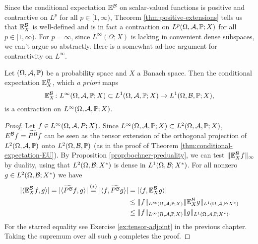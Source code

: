 Since the conditional expectation $\mathbb{E}^{\mathcal{B}}$ on scalar-valued functions is positive and contractive on $L^p$ for all $p \in [1,\infty)$, Theorem \ref{thm:positive-extensions} tells us that $\mathbb{E}_X^{\mathcal{B}}$ is well-defined and is in fact a contraction on $L^p(\Omega,\mathcal{A},\mathbb{P};X)$ for all $p \in [1,\infty)$.
For $p = \infty$, since $L^\infty(\Omega;X)$ is lacking in convenient dense subspaces, we can't argue so abstractly.
Here is a somewhat ad-hoc argument for contractivity on $L^\infty$.

\begin{prop}
  Let $(\Omega,\mathcal{A},\mathbb{P})$ be a probability space and $X$ a Banach space.
  Then the conditional expectation $\mathbb{E}_X^{\mathcal{B}}$, which \emph{a priori} maps
  \begin{equation*}
    \mathbb{E}_X^{\mathcal{B}} \colon L^\infty(\Omega,\mathcal{A},\mathbb{P};X) \subset L^1(\Omega,\mathcal{A},\mathbb{P};X) \rightarrow L^1(\Omega,\mathcal{B},\mathbb{P};X),
  \end{equation*}
  is a contraction on $L^\infty(\Omega,\mathcal{A},\mathbb{P};X)$.
\end{prop}

\begin{proof}
  Let $f \in L^\infty(\Omega,\mathcal{A},P;X)$.
  Since $L^\infty(\Omega,\mathcal{A},\mathbb{P};X) \subset L^2(\Omega,\mathcal{A},\mathbb{P};X)$, $E^{\mathcal{B}} f = \widetilde{P^{\mathcal{B}}} f$ can be seen as the tensor extension of the orthogonal projection of $L^2(\Omega,\mathcal{A},\mathbb{P})$ onto $L^2(\Omega, \mathcal{B},\mathbb{P})$ (as in the proof of Theorem \ref{thm:conditional-expectation-EU}).
  By Proposition \ref{prop:bochner-preduality}, we can test $\|\mathbb{E}_X^{\mathcal{B}} f\|_\infty$ by duality, using that $L^2(\Omega,\mathcal{B}; X^*)$ is dense in $L^1(\Omega, \mathcal{B}; X^*)$.
  For all nonzero $g \in L^2(\Omega, \mathcal{B}; X^*)$ we have
\begin{equation*}
  \begin{aligned}
    | \langle \mathbb{E}_X^{\mathcal{B}} f, g \rangle |
    =  | \langle \widetilde{P^{\mathcal{B}}} f, g \rangle | 
    \stackrel{(*)}{=} | \langle f, \widetilde{P^{\mathcal{B}}} g \rangle | 
    &=  | \langle f, \mathbb{E}_X^{\mathcal{B}} g \rangle | \\
    &\leq  \|f\|_{L^\infty(\Omega,\mathcal{A},\mathbb{P};X)} \|\mathbb{E}_X^{\mathcal{B}} g\|_{L^1(\Omega,\mathcal{A},\mathbb{P};X^*)} \\
    &\leq  \|f\|_{L^\infty(\Omega,\mathcal{A},\mathbb{P};X)} \| g\|_{L^1(\Omega,\mathcal{A},\mathbb{P};X^*)}.
  \end{aligned}
\end{equation*}
For the starred equality see Exercise \ref{ex:tensor-adjoint} in the previous chapter.
Taking the supremum over all such $g$ completes the proof.
\end{proof}


